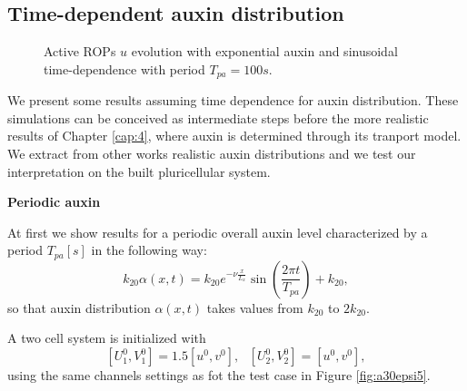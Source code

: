 \subsection{Time-dependent auxin distribution}
\begin{figure}[t]
    \centering
    \quad
    \quad
    \quad
    \quad
    \quad
    \quad
    \caption[RR with time dependent auxin - period $T_{pa} = 100s$]{Active ROPs $u$ evolution with exponential auxin and sinusoidal time-dependence with period $T_{pa} = 100s$.}
    \label{fig:auxT100}
\end{figure}

We present some results assuming time dependence for auxin distribution. These simulations can be conceived as intermediate steps before the more realistic results of Chapter \ref{cap:4}, where auxin is determined through its tranport model. We extract from other works realistic auxin distributions and we test our interpretation on the built pluricellular system.

\textbf{Periodic auxin}

At first we show results for a periodic overall auxin level characterized by a period $T_{pa} [s]$ in the following way:
\begin{equation}
  k_{20} \alpha(x,t) = k_{20} e^{-\nu \frac{x}{L_x}} \sin\left(\frac{2\pi t}{T_{pa}}\right) + k_{20} ,
\end{equation}
so that auxin distribution $\alpha(x,t)$ takes values from $k_{20}$ to $2 k_{20}$.

A two cell system is initialized with
\begin{equation*}
 \left[ U_1^0, V_1^0 \right] = 1.5 \left[u^0,v^0 \right], \ \ \ \left[ U_2^0, V_2^0 \right] = \left[u^0,v^0 \right],
\end{equation*}
using the same channels settings as fot the test case in Figure \ref{fig:a30epsi5}.

